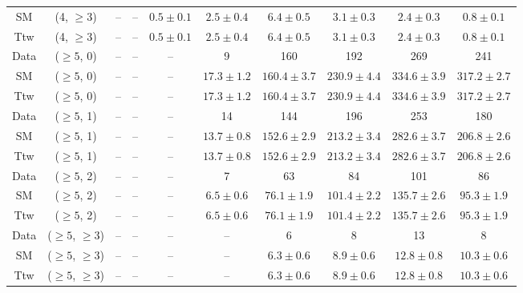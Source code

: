 \begin{table}[h!]
{\begin{tabular}{cccccccccc}
	SM & (4, $\ge3$) & -- & -- & $0.5\pm 0.1$ & $2.5\pm 0.4$ & $6.4\pm 0.5$ & $3.1\pm 0.3$ & $2.4\pm 0.3$ & $0.8\pm 0.1$ \\[0.5ex] 
	Ttw & (4, $\ge3$) & -- & -- & $0.5\pm 0.1$ & $2.5\pm 0.4$ & $6.4\pm 0.5$ & $3.1\pm 0.3$ & $2.4\pm 0.3$ & $0.8\pm 0.1$ \\[0.5ex] 
	Data & ($\ge5$, 0) & -- & -- & -- & 9 & 160 & 192 & 269 & 241 \\[0.5ex] 
	SM & ($\ge5$, 0) & -- & -- & -- & $17.3\pm 1.2$ & $160.4\pm 3.7$ & $230.9\pm 4.4$ & $334.6\pm 3.9$ & $317.2\pm 2.7$ \\[0.5ex] 
	Ttw & ($\ge5$, 0) & -- & -- & -- & $17.3\pm 1.2$ & $160.4\pm 3.7$ & $230.9\pm 4.4$ & $334.6\pm 3.9$ & $317.2\pm 2.7$ \\[0.5ex] 
	Data & ($\ge5$, 1) & -- & -- & -- & 14 & 144 & 196 & 253 & 180 \\[0.5ex] 
	SM & ($\ge5$, 1) & -- & -- & -- & $13.7\pm 0.8$ & $152.6\pm 2.9$ & $213.2\pm 3.4$ & $282.6\pm 3.7$ & $206.8\pm 2.6$ \\[0.5ex] 
	Ttw & ($\ge5$, 1) & -- & -- & -- & $13.7\pm 0.8$ & $152.6\pm 2.9$ & $213.2\pm 3.4$ & $282.6\pm 3.7$ & $206.8\pm 2.6$ \\[0.5ex] 
	Data & ($\ge5$, 2) & -- & -- & -- & 7 & 63 & 84 & 101 & 86 \\[0.5ex] 
	SM & ($\ge5$, 2) & -- & -- & -- & $6.5\pm 0.6$ & $76.1\pm 1.9$ & $101.4\pm 2.2$ & $135.7\pm 2.6$ & $95.3\pm 1.9$ \\[0.5ex] 
	Ttw & ($\ge5$, 2) & -- & -- & -- & $6.5\pm 0.6$ & $76.1\pm 1.9$ & $101.4\pm 2.2$ & $135.7\pm 2.6$ & $95.3\pm 1.9$ \\[0.5ex] 
	Data & ($\ge5$, $\ge3$) & -- & -- & -- & -- & 6 & 8 & 13 & 8 \\[0.5ex] 
	SM & ($\ge5$, $\ge3$) & -- & -- & -- & -- & $6.3\pm 0.6$ & $8.9\pm 0.6$ & $12.8\pm 0.8$ & $10.3\pm 0.6$ \\[0.5ex] 
	Ttw & ($\ge5$, $\ge3$) & -- & -- & -- & -- & $6.3\pm 0.6$ & $8.9\pm 0.6$ & $12.8\pm 0.8$ & $10.3\pm 0.6$ \\[0.5ex] 
	\hline
	\hline
\end{tabular}}
\end{table}
